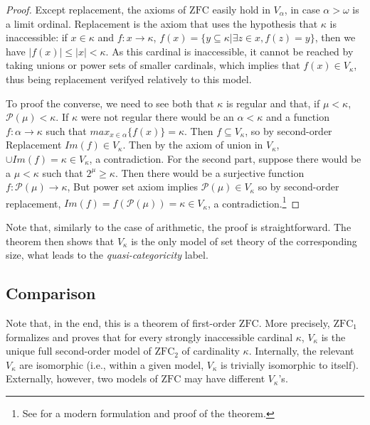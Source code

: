 \documentclass[11pt,a4paper]{book}
\theoremstyle{plain}
\begin{document}
\begin{proof}

Except replacement, the axioms of $\mathrm{ZFC}$ easily hold in \(V_\alpha\), in case \(\alpha > \omega\) is a limit ordinal. Replacement is the axiom that uses the hypothesis that $\kappa$ is inaccessible: if $x \in \kappa$ and $f: x \to \kappa$, $f(x)= \{ y \subseteq \kappa | \exists z \in x, f(z) = y \}$, then we have $|f(x)| \leq |x| < \kappa$. As this cardinal is inaccessible, it cannot be reached by taking unions or power sets of smaller cardinals, which implies that $f(x) \in V_\kappa$, thus being replacement verifyed relatively to this model.

To proof the converse, we need to see both that $\kappa$ is regular and that, if $\mu < \kappa$, $\mathcal{P}(\mu) < \kappa$. If $\kappa$ were not regular there would be an $\alpha < \kappa$ and a function $f : \alpha \to \kappa$ such that $max_{x\in\alpha}\{ f(x) \} = \kappa$. Then $f \subseteq V_\kappa$, so by second-order Replacement $Im(f) \in V_\kappa$. Then by the axiom of union in $V_\kappa$, $\cup Im(f) = \kappa \in V_\kappa$, a contradiction. For the second part, suppose there would be a \(\mu < \kappa\) such that $2^\mu \geq \kappa$. Then there would be a surjective function $f : \mathcal{P}(\mu)\to \kappa$, But power set axiom implies $\mathcal{P}(\mu) \in V_\kappa$ so by second-order replacement, $Im(f)= f(\mathcal{P}(\mu))=\kappa \in V_\kappa$, a contradiction.\footnote{See \textcite[23]{Kanamori2003} for a modern formulation and proof of the theorem.}

\end{proof}

Note that, similarly to the case of arithmetic, the proof is straightforward. The theorem then shows that $V_\kappa$ is the only model of set theory of the corresponding size, what leads to the \textit{quasi-categoricity} label. 

\subsection{Comparison}

Note that, in the end, this is a theorem of first-order $\mathrm{ZFC}$. More precisely, $\mathrm{ZFC}_1$ formalizes and proves that for every strongly inaccessible cardinal $\kappa$, $V_\kappa$ is the unique full second-order model of $\mathrm{ZFC}_2$ of cardinality $\kappa$. Internally, the relevant $V_\kappa$ are isomorphic (i.e., within a given model, $V_\kappa$ is trivially isomorphic to itself). Externally, however, two models of $\mathrm{ZFC}$ may have different $V_\kappa$'s.
\end{document}
